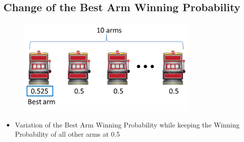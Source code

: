 \documentclass[compress]{beamer}
\begin{document}
\subsection{Change of the Best Arm Winning Probability}

\begin{frame}
\begin{figure}[p]
    \centering
    \includegraphics[width=0.8\textwidth]{arms.png}
\end{figure}
\begin{itemize}
\item Variation of the Best Arm Winning Probability while keeping the Winning Probability of all other arms at 0.5
\end{itemize}
\end{frame}
\end{document}

